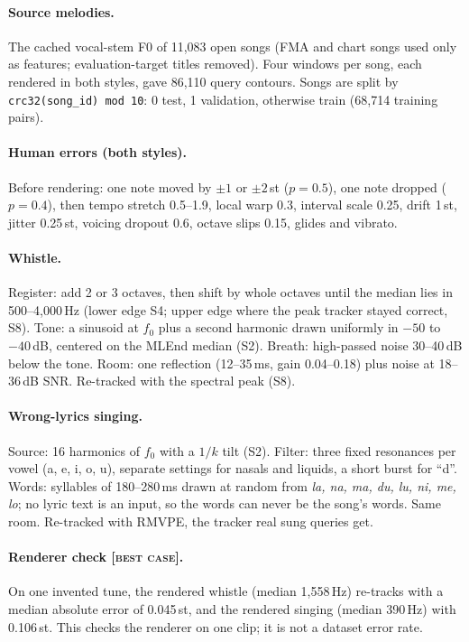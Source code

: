 \documentclass[11pt]{article}
\newcommand{\best}{\textsc{[best case]}}
\newcommand{\st}{\,st}
\begin{document}
\paragraph{Source melodies.} The cached vocal-stem F0 of 11,083 open songs (FMA \citep{defferrard2017fma} and chart songs used only as features; evaluation-target titles removed). Four windows per song, each rendered in both styles, gave 86,110 query contours. Songs are split by \texttt{crc32(song\_id) mod 10}: 0 test, 1 validation, otherwise train (68,714 training pairs).

\paragraph{Human errors (both styles).} Before rendering: one note moved by $\pm1$ or $\pm2$\st{} ($p{=}0.5$), one note dropped ($p{=}0.4$), then tempo stretch 0.5--1.9, local warp 0.3, interval scale 0.25, drift 1\st, jitter 0.25\st, voicing dropout 0.6, octave slips 0.15, glides and vibrato.

\paragraph{Whistle.} Register: add 2 or 3 octaves, then shift by whole octaves until the median lies in 500--4,000\,Hz (lower edge S4; upper edge where the peak tracker stayed correct, S8). Tone: a sinusoid at $f_0$ plus a second harmonic drawn uniformly in $-50$ to $-40$\,dB, centered on the MLEnd median (S2). Breath: high-passed noise 30--40\,dB below the tone. Room: one reflection (12--35\,ms, gain 0.04--0.18) plus noise at 18--36\,dB SNR. Re-tracked with the spectral peak (S8).

\paragraph{Wrong-lyrics singing.} Source: 16 harmonics of $f_0$ with a $1/k$ tilt (S2). Filter: three fixed resonances per vowel (a, e, i, o, u), separate settings for nasals and liquids, a short burst for ``d''. Words: syllables of 180--280\,ms drawn at random from \emph{la, na, ma, du, lu, ni, me, lo}; no lyric text is an input, so the words can never be the song's words. Same room. Re-tracked with RMVPE, the tracker real sung queries get.

\paragraph{Renderer check \best.} On one invented tune, the rendered whistle (median 1,558\,Hz) re-tracks with a median absolute error of 0.045\st, and the rendered singing (median 390\,Hz) with 0.106\st. This checks the renderer on one clip; it is not a dataset error rate.
\end{document}
